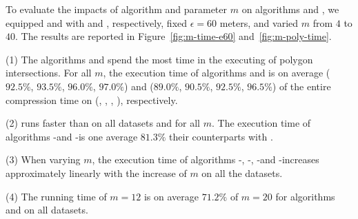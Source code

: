 To evaluate the impacts of algorithm \rpia and parameter $m$ on algorithms \cist and \cista, we
equipped \cist and \cista with \rpia and \cpia, respectively, fixed $\epsilon =60$ meters, and varied $m$ from $4$ to $40$.
%
The results are reported in Figure~\ref{fig:m-time-e60} and~\ref{fig:m-poly-time}.

\ni(1) The algorithms \cist and \cista spend the most time in the executing of polygon intersections. For all $m$, the execution time of algorithms \cpia and \rpia is on average ($92.5\%$, $93.5\%$, $96.0\%$, $97.0\%$) and ($89.0\%$, $90.5\%$, $92.5\%$, $96.5\%$) of the entire compression time on (\truck, \sercar, \geolife, \pricar), respectively.

\ni(2) \rpia runs faster than \cpia on all datasets and for all $m$. The execution time of algorithms \cist-\rpia and \cista-\rpia is one average $81.3\%$ their counterparts with \cpia.

\ni(3) When varying $m$, the execution time of algorithms \cist-\rpia, \cist-\cpia, \cista-\rpia and \cista-\cpia increases approximately linearly with the increase of $m$ on all the datasets.

\ni(4) The running time of $m=12$ is on average {$71.2\%$} of $m=20$ for algorithms \cist and \cista on all datasets.



